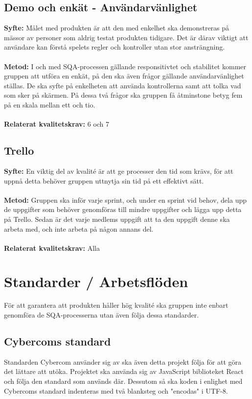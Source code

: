\documentclass[10pt]{article}
\begin{document}
	\subsection{Demo och enkät - Användarvänlighet}
	\textbf{Syfte:} Målet med produkten är att den med enkelhet ska demonstreras på mässor av personer som aldrig testat produkten tidigare. Det är därav viktigt att användare kan förstå spelets regler och kontroller utan stor ansträngning.
	\\\\
	\textbf{Metod:} I och med SQA-processen gällande responsitivtet och stabilitet kommer gruppen att utföra en enkät, på den ska även frågor gällande användarvänlighet ställas. De ska syfte på enkelheten att använda kontrollerna samt att tolka vad som sker på skärmen. På dessa två frågor ska gruppen få åtminstone betyg fem på en skala mellan ett och tio.
	\\\\
	\textbf{Relaterat kvalitetskrav:} 6 och 7
	\\
	
	\subsection{Trello}
	\textbf{Syfte:} En viktig del av kvalité är att ge processer den tid som krävs, för att uppnå detta behöver gruppen uttnytja sin tid på ett effektivt sätt.
	\\\\
	\textbf{Metod:} Gruppen ska inför varje sprint, och under en sprint vid behov, dela upp de uppgifter som behöver genomföras till mindre uppgifter och lägga upp detta på Trello. Sedan är det varje medlems uppgift att ta den uppgift denne ska arbeta med, och inte arbeta på någon annans del.
	\\\\
	\textbf{Relaterat kvalitetskrav:} Alla
	\\
	
	
\pagebreak
\section{Standarder	/	Arbetsflöden}
	För att garantera att produkten håller hög kvalité ska gruppen inte enbart genomföra de SQA-processerna utan även följa dessa standarder.
	
	\subsection{Cybercoms standard}
	Standarden Cybercom använder sig av ska även detta projekt följa för att göra det lättare att utöka. Projektet ska använda sig av JavaScript biblioteket React och följa den standard som används där. Dessutom så ska koden i enlighet med Cybercoms standard indenteras med två blanksteg och "encodas" i UTF-8.
	
\end{document}
